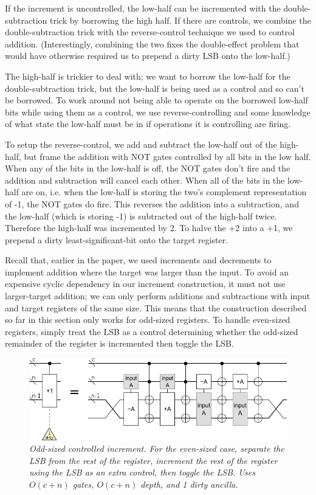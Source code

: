 \documentclass[twocolumn]{article}
\begin{document}
If the increment is uncontrolled, the low-half can be incremented with the double-subtraction trick by borrowing the high half.
If there are controls, we combine the double-subtraction trick with the reverse-control technique we used to control addition.
(Interestingly, combining the two fixes the double-effect problem that would have otherwise required us to prepend a dirty LSB onto the low-half.)

The high-half is trickier to deal with; we want to borrow the low-half for the double-subtraction trick, but the low-half is being used as a control and so can't be borrowed.
To work around not being able to operate on the borrowed low-half bits while using them as a control, we use reverse-controlling and some knowledge of what state the low-half must be in if operations it is controlling are firing.

To setup the reverse-control, we add and subtract the low-half out of the high-half, but frame the addition with NOT gates controlled by all bits in the low half.
When any of the bits in the low-half is off, the NOT gates don't fire and the addition and subtraction will cancel each other.
When all of the bits in the low-half are on, i.e. when the low-half is storing the two's complement representation of -1, the NOT gates do fire.
This reverses the addition into a subtraction, and the low-half (which is storing -1) is subtracted out of the high-half twice.
Therefore the high-half was incremented by 2.
To halve the +2 into a +1, we prepend a dirty least-significant-bit onto the target register.

Recall that, earlier in the paper, we used increments and decrements to implement addition where the target was larger than the input.
To avoid an expensive cyclic dependency in our increment construction, it must not use larger-target addition; we can only perform additions and subtractions with input and target registers of the same size.
This means that the construction described so far in this section only works for odd-sized registers.
To handle even-sized registers, simply treat the LSB as a control determining whether the odd-sized remainder of the register is incremented then toggle the LSB.

\begin{figure}
  \centering
  \includegraphics[width=\linewidth]{assets/controlled-increment-odd.png}
  \caption{\em
    Odd-sized controlled increment.
    For the even-sized case, separate the LSB from the rest of the register, increment the rest of the register using the LSB as an extra control, then toggle the LSB.
    Uses $O(c+n)$ gates, $O(c+n)$ depth, and 1 dirty ancilla.
  }
  \label{fig:controlled-increment-odd}
\end{figure}
\end{document}
